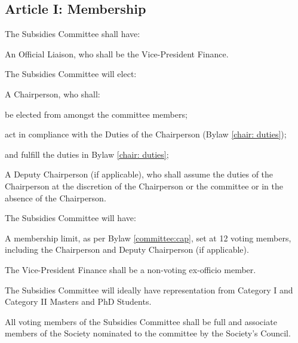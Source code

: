 \subsection{Article I: Membership}
\begin{longenum}[ label*=\thesubsection.\arabic*., align=left] 
	\item The Subsidies Committee shall have:
		\begin{longenum}[ label*=\arabic*., align=left] 
		\item An Official Liaison, who shall be the Vice-President Finance.
		\end{longenum}
	\item The Subsidies Committee will elect:
		\begin{longenum}[ label*=\arabic*., align=left]
		\item A Chairperson, who shall:
			\begin{longenum}[ label*=\arabic*., align=left]
			\item be elected from amongst the committee members;
			\item act in compliance with the Duties of the Chairperson (Bylaw \ref{chair: duties});
			\item and fulfill the duties in Bylaw \ref{chair: duties};
			\item A Deputy Chairperson (if applicable), who shall assume the duties of the Chairperson at the discretion of the Chairperson or the committee or in the absence of the Chairperson.
			\end{longenum}
		\end{longenum}
	\item The Subsidies Committee will have:
		\begin{longenum}[ label*=\arabic*., align=left]
		\item A membership limit, as per Bylaw \ref{committee:cap}, set at 12 voting members, including the Chairperson and Deputy Chairperson (if applicable).
		\end{longenum}
	\item The Vice-President Finance shall be a non-voting ex-officio member.
	\item The Subsidies Committee will ideally have representation from Category I and Category II Masters and PhD Students.
	\item All voting members of the Subsidies Committee shall be full and associate members of the Society nominated to the committee by the Society’s Council.     
\end{longenum}


